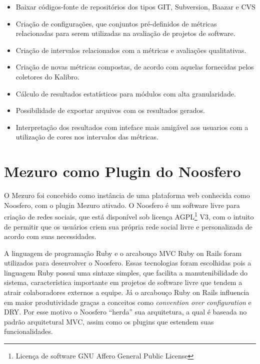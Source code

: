 \begin{itemize}
\item Baixar códigos-fonte de repositórios dos tipos GIT, Subversion, Baazar e CVS
\item Criação de configurações, que conjuntos pré-definidos de métricas relacionadas para serem utilizadas na avaliação de projetos de software.
\item Criação de intervalos relacionados com a métricas e avaliações qualitativas.
\item Criação de novas métricas compostas, de acordo com aquelas fornecidas pelos coletores do Kalibro.
\item Cálculo de resultados estatísticos para módulos com alta granularidade.
\item Possibilidade de exportar arquivos com os resultados gerados.
\item Interpretação dos resultados com inteface mais amigável aos usuarios com a utilização de cores nos intervalos das métricas.
\end{itemize}



\section{Mezuro como Plugin do Noosfero}

O Mezuro foi concebido como instância de uma plataforma web conhecida como Noosfero, com o plugin Mezuro ativado. O Noosfero é um software livre para criação de redes sociais, que está disponível sob licença AGPL\footnote{Licença de software GNU Affero General Public License} V3, com o intuito de permitir que os usuários criem sua própria rede social livre e personalizada de acordo com suas necessidades.

A linguagem de programação Ruby e o arcabouço MVC Ruby on Rails foram utilizados para desenvolver o Noosfero. Essas tecnologias foram escolhidas pois a linguagem Ruby possui uma sintaxe simples, que facilita a manutenibilidade do sistema, característica importante em projetos de software livre que tendem a atrair colaboradores externos a equipe. Já o arcabouço Ruby on Rails influencia em maior produtividade graças a conceitos como \textit{convention over configuration} e DRY. Por esse motivo o Noosfero ``herda'' sua arquitetura, a qual é baseada no padrão arquitetural MVC, assim como os plugins que estendem suas funcionalidades.

